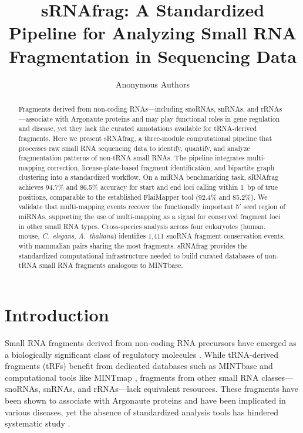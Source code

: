 \documentclass[11pt]{article}
\title{sRNAfrag: A Standardized Pipeline for Analyzing Small RNA Fragmentation in Sequencing Data}
\author{Anonymous Authors}
\date{}
\begin{document}
\maketitle

\begin{abstract}
Fragments derived from non-coding RNAs---including snoRNAs, snRNAs, and rRNAs---associate with Argonaute proteins and may play functional roles in gene regulation and disease, yet they lack the curated annotations available for tRNA-derived fragments. Here we present sRNAfrag, a three-module computational pipeline that processes raw small RNA sequencing data to identify, quantify, and analyze fragmentation patterns of non-tRNA small RNAs. The pipeline integrates multi-mapping correction, license-plate-based fragment identification, and bipartite graph clustering into a standardized workflow. On a miRNA benchmarking task, sRNAfrag achieves 94.7\% and 86.5\% accuracy for start and end loci calling within 1~bp of true positions, comparable to the established FlaiMapper tool (92.4\% and 85.2\%). We validate that multi-mapping events recover the functionally important 5$'$ seed region of miRNAs, supporting the use of multi-mapping as a signal for conserved fragment loci in other small RNA types. Cross-species analysis across four eukaryotes (human, mouse, \textit{C.~elegans}, \textit{A.~thaliana}) identifies 1,411 snoRNA fragment conservation events, with mammalian pairs sharing the most fragments. sRNAfrag provides the standardized computational infrastructure needed to build curated databases of non-tRNA small RNA fragments analogous to MINTbase.
\end{abstract}

\section{Introduction}

Small RNA fragments derived from non-coding RNA precursors have emerged as a biologically significant class of regulatory molecules \citep{taft2009snorna, maute2013tsrna}. While tRNA-derived fragments (tRFs) benefit from dedicated databases such as MINTbase \citep{kumar2015mintbase} and computational tools like MINTmap \citep{loher2017mintmap}, fragments from other small RNA classes---snoRNAs, snRNAs, and rRNAs---lack equivalent resources. These fragments have been shown to associate with Argonaute proteins and have been implicated in various diseases, yet the absence of standardized analysis tools has hindered systematic study \citep{falaleeva2017rrna}.
\end{document}
